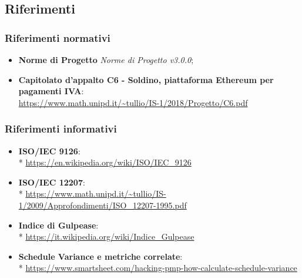 \subsection{Riferimenti}
\subsubsection{Riferimenti normativi}
\begin{itemize}
\item \textbf{Norme di Progetto} \textit{Norme di Progetto v3.0.0};
\item \textbf{Capitolato d'appalto C6 - Soldino, piattaforma Ethereum per pagamenti IVA}: \\ \url{https://www.math.unipd.it/~tullio/IS-1/2018/Progetto/C6.pdf}
\end{itemize}
\subsubsection{Riferimenti informativi}
\begin{itemize}
\item \textbf{ISO/IEC 9126}: \\* \url{https://en.wikipedia.org/wiki/ISO/IEC_9126}
\item \textbf{ISO/IEC 12207}: \\* 
\url{https://www.math.unipd.it/~tullio/IS-1/2009/Approfondimenti/ISO\_12207-1995.pdf}
\item \textbf{Indice di Gulpease}: \\* \url{https://it.wikipedia.org/wiki/Indice_Gulpease}
\item \textbf{Schedule Variance e metriche correlate}:\\* \url{https://www.smartsheet.com/hacking-pmp-how-calculate-schedule-variance}
\end{itemize}